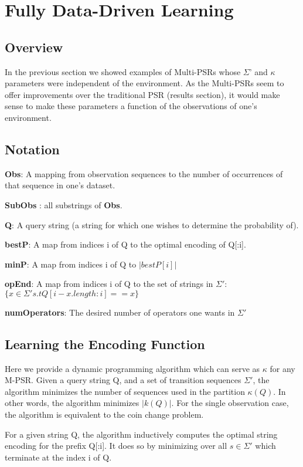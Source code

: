 \section{Fully Data-Driven Learning}

\subsection{Overview}

In the previous section we showed examples of Multi-PSRs whose $\Sigma$' and $\kappa$ parameters were independent of the environment. As the Multi-PSRs seem to offer improvements over the traditional PSR (results section), it would make sense to make these parameters a function of the observations of one's environment. 

\subsection{Notation}

\textbf{Obs}: A mapping from observation sequences to the number of occurrences of that sequence in one's dataset. 

\textbf{SubObs} : all substrings of \textbf{Obs}.

\textbf{Q}: A query string (a string for which one wishes to determine the probability of).

\textbf{bestP}: A map from indices i of Q to the optimal encoding of Q[:i].

\textbf{minP}: A map from indices i of Q to $|bestP[i]|$

\textbf{opEnd}: A map from indices i of Q to the set of strings in $\Sigma'$: $\{x \in \Sigma' s.t Q[i-x.length:i] == x\}$

\textbf{numOperators}: The desired number of operators one wants in $\Sigma'$

\subsection{Learning the Encoding Function}

Here we provide a dynamic programming algorithm which can serve as $\kappa$ for any M-PSR. Given a query string Q, and a set of transition sequences $\Sigma'$, the algorithm minimizes the number of sequences used in the partition $\kappa(Q)$. In other words, the algorithm minimizes $|k(Q)|$. For the single observation case, the algorithm is equivalent to the coin change problem.

For a given string Q, the algorithm inductively computes the optimal string encoding for the prefix Q[:i]. It does so by minimizing over all $s \in \Sigma'$ which terminate at the index i of Q.

